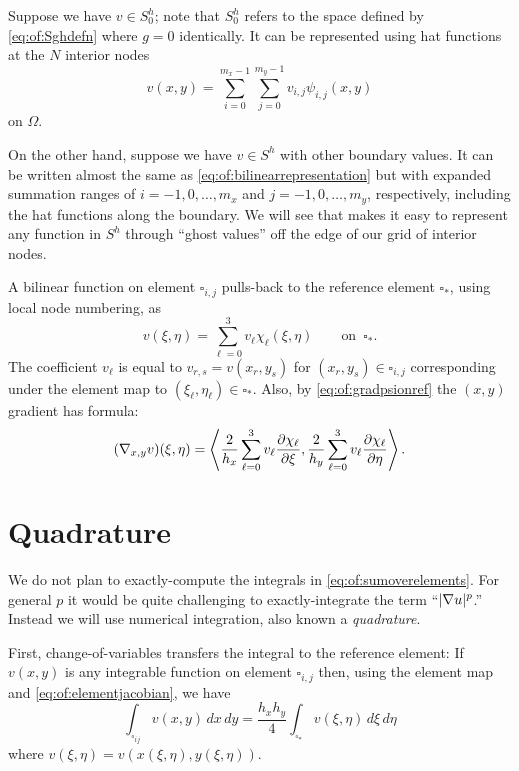 Suppose we have $v \in S_0^h$; note that $S_0^h$ refers to the space defined by \eqref{eq:of:Sghdefn} where $g=0$ identically.  It can be represented using hat functions at the $N$ interior nodes
\begin{equation}
v(x,y) = \sum_{i=0}^{m_x-1} \sum_{j=0}^{m_y-1} v_{i,j} \psi_{i,j}(x,y) \label{eq:of:bilinearrepresentation}
\end{equation}
on $\Omega$.

On the other hand, suppose we have $v \in S^h$ with other boundary values.  It can be written almost the same as \eqref{eq:of:bilinearrepresentation} but with expanded summation ranges of $i=-1,0,\dots,m_x$ and $j=-1,0,\dots,m_y$, respectively, including the hat functions along the boundary.  We will see that \PETSc makes it easy to represent any function in $S^h$ through ``ghost values'' off the edge of our grid of interior nodes.

A bilinear function on element $\square_{i,j}$ pulls-back to the reference element $\square_\ast$, using local node numbering, as
\begin{equation}
v(\xi,\eta) = \sum_{\ell=0}^3 v_\ell \chi_\ell(\xi,\eta)  \qquad \text{on } \,\square_\ast. \label{eq:of:bilinearref}
\end{equation}
The coefficient $v_\ell$ is equal to $v_{r,s} = v(x_r,y_s)$ for $(x_r,y_s)\in\square_{i,j}$ corresponding under the element map to $(\xi_\ell,\eta_\ell) \in \square_\ast$.  Also, by \eqref{eq:of:gradpsionref} the $(x,y)$ gradient has formula:
\begin{equation}
  (\nabla_{x,y} v)(\xi,\eta) = \left<\frac{2}{h_x} \sum_{\ell=0}^3 v_\ell \frac{\partial\chi_\ell}{\partial \xi}, \frac{2}{h_y} \sum_{\ell=0}^3 v_\ell \frac{\partial\chi_\ell}{\partial \eta}\right>. \label{eq:of:gradrepref}
\end{equation}


\section{Quadrature}

We do not plan to exactly-compute the integrals in \eqref{eq:of:sumoverelements}.  For general $p$ it would be quite challenging to exactly-integrate the term ``$|\nabla u|^p$.''  Instead we will use numerical integration, also known a \emph{quadrature}.

First, change-of-variables transfers the integral to the reference element: If $v(x,y)$ is any integrable function on element $\square_{i,j}$ then, using the element map and \eqref{eq:of:elementjacobian}, we have
\begin{equation}
\int_{\square_{ij}} v(x,y)\,dx\,dy = \frac{h_x h_y}{4} \int_{\square_\ast} v(\xi,\eta) \,d\xi\,d\eta \label{eq:of:changeofvars}
\end{equation}
where $v(\xi,\eta)=v(x(\xi,\eta),y(\xi,\eta))$.

